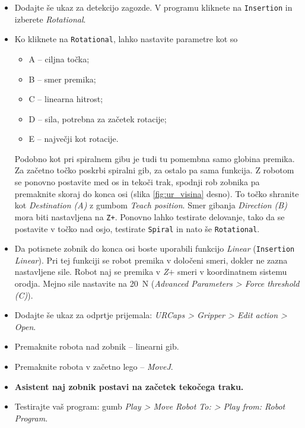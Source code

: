     \begin{mdframed}[backgroundcolor=yellow!20, shadow=true,roundcorner=8pt]
\begin{itemize}
  \item Dodajte še ukaz za detekcijo zagozde. V programu kliknete na \verb"Insertion" in izberete \emph{Rotational}.
  \item Ko kliknete na \verb"Rotational", lahko nastavite parametre kot so
   \begin{itemize}
          \item A -- ciljna točka;
          \item B -- smer premika;
          \item C -- linearna hitrost;
          \item D -- sila, potrebna za začetek rotacije;
          \item E -- največji kot rotacije.
  \end{itemize}
  Podobno kot pri spiralnem gibu je tudi tu pomembna samo globina premika. Za začetno točko poskrbi spiralni gib, za ostalo pa sama funkcija. Z robotom se ponovno postavite med os in tekoči trak, spodnji rob zobnika pa premaknite skoraj do konca osi (slika \ref{fig:ur_visina} desno). To točko shranite kot \emph{Destination (A)} z gumbom \emph{Teach position}. Smer gibanja \emph{Direction (B)} mora biti nastavljena na \verb"Z+". Ponovno lahko testirate delovanje, tako da se postavite v točko nad osjo, testirate \verb"Spiral" in nato še \verb"Rotational".
  \item Da potisnete zobnik do konca osi boste uporabili funkcijo \emph{Linear} (\verb"Insertion" \emph{Linear}). Pri tej funkciji se robot premika v določeni smeri, dokler ne zazna nastavljene sile. Robot naj se premika v \emph{Z$+$} smeri v koordinatnem sistemu orodja. Mejno sile nastavite na 20~N (\emph{Advanced Parameters > Force threshold (C)}).
  \item Dodajte še ukaz za odprtje prijemala: \emph{URCaps > Gripper > Edit action > Open}.
  \item Premaknite robota nad zobnik -- linearni gib.
  \item Premaknite robota v začetno lego -- \emph{MoveJ}.
  \end{itemize}
\end{mdframed}

  \begin{mdframed}[backgroundcolor=red!20, shadow=true,roundcorner=8pt]
    \begin{itemize}
       \item \textbf{Asistent naj zobnik postavi na začetek tekočega traku.}
    \end{itemize}
\end{mdframed}
      \begin{mdframed}[backgroundcolor=yellow!20, shadow=true,roundcorner=8pt]
\begin{itemize}
  \item Testirajte vaš program: gumb \emph{Play > Move Robot To: > Play from: Robot Program}.
\end{itemize}
\end{mdframed}

